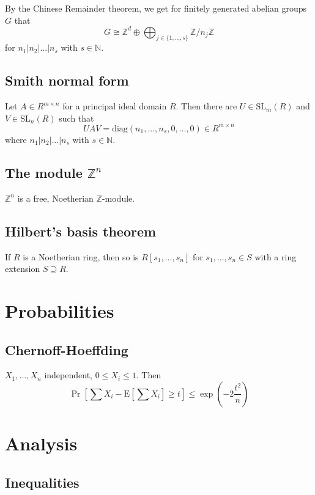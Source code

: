 \documentclass{scrartcl}
\newcommand{\Ex}{\mathrm{E}}
\newcommand{\N}{\mathbb{N}}
\newcommand{\Z}{\mathbb{Z}}
\begin{document}
By the Chinese Remainder theorem, we get for finitely generated abelian groups $G$ that
\begin{equation*}
    G \cong \Z^d \oplus \bigoplus_{j \in \{1, ..., s\}} \Z/n_j\Z
\end{equation*}
for $n_1 | n_2 | ... | n_s$ with $s \in \N$.

\subsection{Smith normal form}
Let $A \in R^{m \times n}$ for a principal ideal domain $R$. Then there are $U \in \mathrm{SL}_m(R)$ and $V \in \mathrm{SL}_n(R)$ such that
\begin{equation*}
    U A V = \mathrm{diag}(n_1, ..., n_s, 0, ..., 0) \in R^{m \times n}
\end{equation*}
where $n_1 | n_2 | ... | n_s$ with $s \in \N$.

\subsection{The module $\Z^n$}
$\Z^n$ is a free, Noetherian $\Z$-module.

\subsection{Hilbert's basis theorem}
If $R$ is a Noetherian ring, then so is $R[s_1, ..., s_n]$ for $s_1, ..., s_n \in S$ with a ring extension $S \supseteq R$.

\section{Probabilities}

\subsection{Chernoff-Hoeffding}
$X_1, ..., X_n$ independent, $0 \leq X_i \leq 1$. Then
\begin{equation}
    \Pr\left[\sum X_i - \Ex\left[\sum X_i\right] \geq t\right] \leq \exp\left(-2\frac {t^2} n\right) \nonumber
\end{equation}

\section{Analysis}

\subsection{Inequalities}
\end{document}
